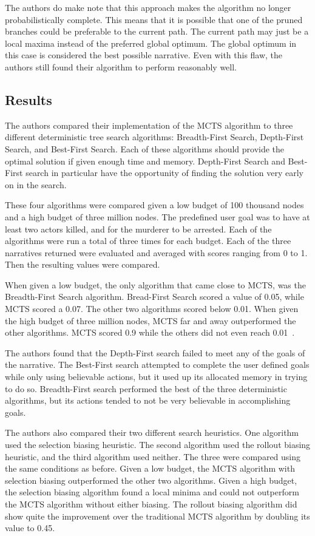 \documentclass{sig-alternate}
\begin{document}
The authors do make note that this approach makes the algorithm no longer probabilistically complete. This means that it is possible that one of the pruned branches could be preferable to the current path. The current path may just be a local maxima instead of the preferred global optimum. The global optimum in this case is considered the best possible narrative. Even with this flaw, the authors still found their algorithm to perform reasonably well.

\subsection{Results}
The authors compared their implementation of the MCTS algorithm to three different deterministic tree search algorithms: Breadth-First Search, Depth-First Search, and Best-First Search\cite{Narrative}. Each of these algorithms should provide the optimal solution if given enough time and memory. Depth-First Search and Best-First search in particular have the opportunity of finding the solution very early on in the search.

These four algorithms were compared given a low budget of 100 thousand nodes and a high budget of three million nodes. The predefined user goal was to have at least two actors killed, and for the murderer to be arrested. Each of the algorithms were run a total of three times for each budget. Each of the three narratives returned were evaluated and averaged with scores ranging from 0 to 1. Then the resulting values were compared. 

When given a low budget, the only algorithm that came close to MCTS, was the Breadth-First Search algorithm. Bread-First Search scored a value of 0.05, while MCTS scored a 0.07. The other two algorithms scored below 0.01. When given the high budget of three million nodes, MCTS far and away outperformed the other algorithms. MCTS scored 0.9 while the others did not even reach 0.01~\cite{Narrative}.

The authors found that the Depth-First search failed to meet any of the goals of the narrative. The Best-First search attempted to complete the user defined goals while only using believable actions, but it used up its allocated memory in trying to do so. Breadth-First search performed the best of the three deterministic algorithms, but its actions tended to not be very believable in accomplishing goals.

The authors also compared their two different search heuristics. One algorithm used the selection biasing heuristic. The second algorithm used the rollout biasing heuristic, and the third algorithm used neither. The three were compared using the same conditions as before. Given a low budget, the MCTS algorithm with selection biasing outperformed the other two algorithms. Given a high budget, the selection biasing algorithm found a local minima and could not outperform the MCTS algorithm without either biasing. The rollout biasing algorithm did show quite the improvement over the traditional MCTS algorithm by doubling its value to 0.45.
\end{document}
